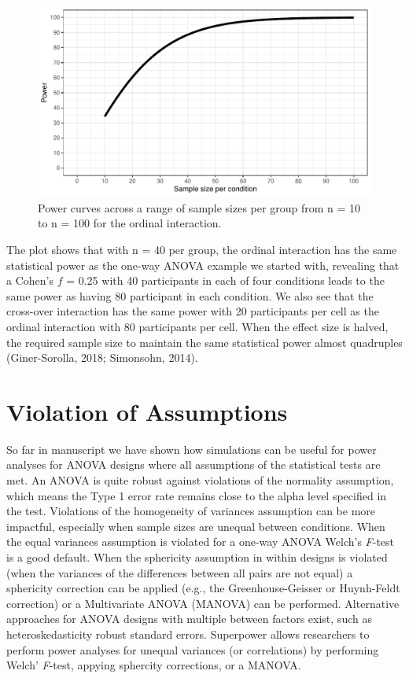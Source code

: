 \documentclass[
  ,jou,floatsintext]{apa6}
\begin{document}
\begin{figure}
\centering
\includegraphics{0.1_Simulation_Based_Power_Analysis_For_Factorial_ANOVA_Designs_files/figure-latex/power-plot-1.pdf}
\caption{\label{fig:power-plot}Power curves across a range of sample sizes per group from n = 10 to n = 100 for the ordinal interaction.}
\end{figure}

The plot shows that with n = 40 per group, the ordinal interaction has the same statistical power as the one-way ANOVA example we started with, revealing that a Cohen's \(f\) = 0.25 with 40 participants in each of four conditions leads to the same power as having 80 participant in each condition.
We also see that the cross-over interaction has the same power with 20 participants per cell as the ordinal interaction with 80 participants per cell.
When the effect size is halved, the required sample size to maintain the same statistical power almost quadruples (Giner-Sorolla, 2018; Simonsohn, 2014).

\hypertarget{violation-of-assumptions}{%
\section{Violation of Assumptions}\label{violation-of-assumptions}}

So far in manuscript we have shown how simulations can be useful for power analyses for ANOVA designs where all assumptions of the statistical tests are met.
An ANOVA is quite robust against violations of the normality assumption, which means the Type 1 error rate remains close to the alpha level specified in the test. Violations of the homogeneity of variances assumption can be more impactful, especially when sample sizes are unequal between conditions.
When the equal variances assumption is violated for a one-way ANOVA Welch's \emph{F}-test is a good default.
When the sphericity assumption in within designs is violated (when the variances of the differences between all pairs are not equal) a sphericity correction can be applied (e.g., the Greenhouse-Geisser or Huynh-Feldt correction) or a Multivariate ANOVA (MANOVA) can be performed.
Alternative approaches for ANOVA designs with multiple between factors exist, such as heteroskedasticity robust standard errors.
Superpower allows researchers to perform power analyses for unequal variances (or correlations) by performing Welch' \emph{F}-test, appying sphercity corrections, or a MANOVA.
\end{document}
